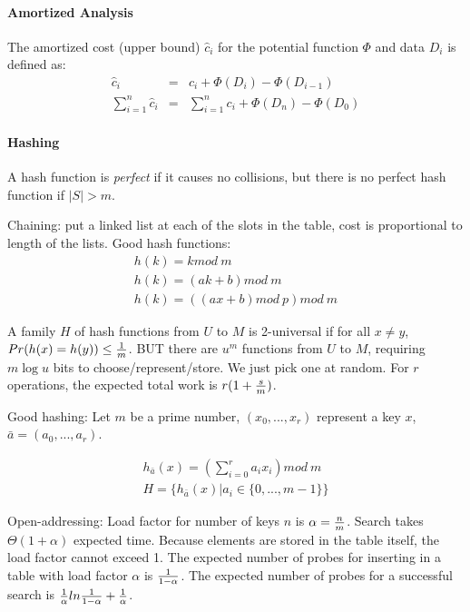 \documentclass[10pt,letterpaper]{article}
\begin{document}

\paragraph{Amortized Analysis} The amortized cost (upper bound) $\hat{c}_i$ for the potential function $\Phi$ and data $D_i$ is defined as:
\begin{eqnarray*}
\hat{c}_i &=& c_i + \Phi(D_i) - \Phi(D_{i-1}) \\
\sum_{i=1}^n \hat{c}_i &=& \sum_{i=1}^n c_i + \Phi(D_n) - \Phi(D_0)
\end{eqnarray*}

\paragraph{Hashing} A hash function is \emph{perfect} if it causes no collisions, but there is no perfect hash function if $|S|>m$. 

Chaining: put a linked list at each of the slots in the table, cost is proportional to length of the lists. Good hash functions:
\begin{eqnarray*}
h(k) = k mod~m \\
h(k) = (ak + b) mod~m \\
h(k) = ((ax + b) mod~p) mod~m
\end{eqnarray*}

A family $H$ of hash functions from $U$ to $M$ is 2-universal if for all $x \neq y$, $Pr(h(x)=h(y)) \leq {1 \over m}$. BUT there are $u^m$ functions from $U$ to $M$, requiring $m \log u$ bits to choose/represent/store. We just pick one at random. For $r$ operations, the expected total work is $r(1+{s \over m})$. 

Good hashing: Let $m$ be a prime number, $(x_0, ..., x_r)$ represent a key $x$, $\bar{a}=(a_0, ..., a_r)$. 

\begin{eqnarray*}
h_{\bar{a}}(x)= (\sum_{i=0}^r a_i x_i) mod~m \\
H = \{ h_{\bar{a}}(x) | a_i \in \{0, ..., m-1 \} \}
\end{eqnarray*}

Open-addressing: Load factor for number of keys $n$ is $\alpha={n \over m}$. Search takes $\Theta(1+\alpha)$ expected time. Because elements are stored in the table itself, the load factor cannot exceed 1. The expected number of probes for inserting in a table with load factor $\alpha$ is $1 \over 1-\alpha$. The expected number of probes for a successful search is ${1 \over \alpha} ln {1 \over 1-\alpha} + {1 \over \alpha}$.
\end{document}

